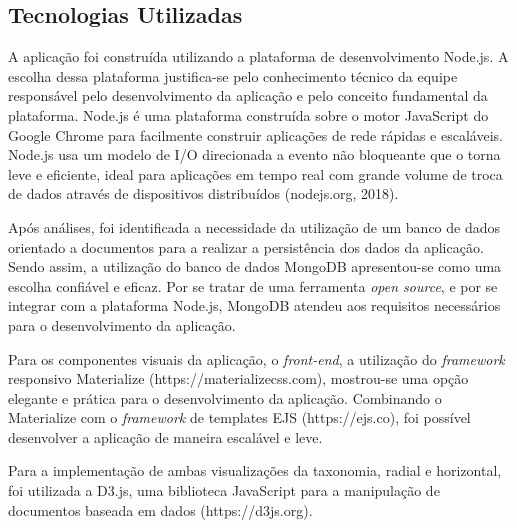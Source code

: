 \subsection{Tecnologias Utilizadas}
\label{subsec:tecnologias}

A aplicação foi construída utilizando a plataforma de desenvolvimento Node.js. A escolha dessa plataforma justifica-se pelo conhecimento técnico da equipe
responsável pelo desenvolvimento da aplicação e pelo conceito fundamental da plataforma. Node.js é uma plataforma construída sobre o motor JavaScript do 
Google Chrome para facilmente construir aplicações de rede rápidas e escaláveis. Node.js usa um modelo de I/O direcionada a evento não bloqueante que o torna leve e eficiente,
ideal para aplicações em tempo real com grande volume de troca de dados através de dispositivos distribuídos (nodejs.org, 2018).

\par
Após análises, foi identificada a necessidade da utilização de um banco de dados orientado a documentos para a realizar a persistência dos dados da aplicação. 
Sendo assim, a utilização do banco de dados MongoDB apresentou-se como uma escolha confiável e eficaz. 
Por se tratar de uma ferramenta \textit{open source}, e por se integrar com a plataforma Node.js, MongoDB atendeu aos requisitos necessários para o desenvolvimento da aplicação.

\par
Para os componentes visuais da aplicação, o \textit{front-end}, a utilização do \textit{framework} responsivo Materialize (https://materializecss.com), 
mostrou-se uma opção elegante e prática para o desenvolvimento da aplicação. Combinando o Materialize com o \textit{framework} de templates EJS (https://ejs.co), 
foi possível desenvolver a aplicação de maneira escalável e leve.

\par
Para a implementação de ambas visualizações da taxonomia, radial e horizontal, foi utilizada a D3.js, uma biblioteca JavaScript para a manipulação de documentos 
baseada em dados (https://d3js.org).

